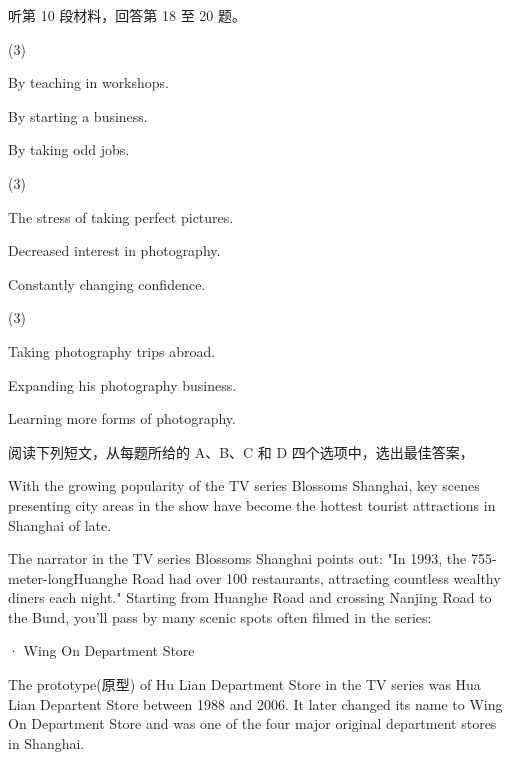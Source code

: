 \documentclass{英语试卷}
\begin{document}
\par 听第 10 段材料，回答第 18 至 20 题。\par
{}
\begin{choices}(3)
  \item By teaching in workshops.
  \item By starting a business.
  \item By taking odd jobs.
\end{choices}
\begin{choices}(3)
  \item The stress of taking perfect pictures.
  \item Decreased interest in photography.
  \item Constantly changing confidence.
\end{choices}
\begin{choices}(3)
  \item Taking photography trips abroad.
  \item Expanding his photography business.
  \item Learning more forms of photography.
\end{choices}
\par 阅读下列短文，从每题所给的 A、B、C 和 D 四个选项中，选出最佳答案，\par
{}
\par With the growing popularity of the TV series Blossoms Shanghai, key scenes presenting city areas in the show have become the hottest tourist attractions in Shanghai of late.\par
\par The narrator in the TV series Blossoms Shanghai points out: "In 1993, the 755-meter-longHuanghe Road had over 100 restaurants, attracting countless wealthy diners each night." Starting from Huanghe Road and crossing Nanjing Road to the Bund, you'll pass by many scenic spots often filmed in the series:\par
\par · Wing On Department Store\par
\par The prototype(原型) of Hu Lian Department Store in the TV series was Hua Lian Departent Store between 1988 and 2006. It later changed its name to Wing On Department Store and was one of the four major original department stores in Shanghai.\par
\end{document}
